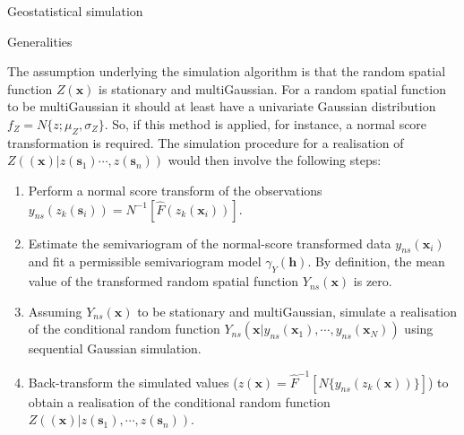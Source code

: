\documentclass[8pt]{beamer}
\renewcommand{\emph}[1]{\textcolor{myorange}{#1}}
\begin{document}
\begin{frame}{Geostatistical simulation}
     \begin{block}{Generalities}
    \end{block}
    The assumption underlying the \emph{simulation algorithm} is that the \emph{random spatial function} $Z(\mathbf{x})$ is \emph{stationary} and \emph{multiGaussian}. For a \emph{random spatial function} to be \emph{multiGaussian} it should at least have a \emph{univariate Gaussian distribution} $f_Z = N\{z;\mu_Z, \sigma_Z\}$. So, if this method is applied, for instance, a \emph{normal score transformation} is required. The \emph{simulation procedure} for a \emph{realisation} of $Z( (\mathbf{x}) | z(\mathbf{s}_1) \cdots, z(\mathbf{s}_n)) $ would then involve the following steps:
\begin{enumerate}
    \item Perform a \emph{normal score transform} of the observations $y_{ns}(z_k(\mathbf{s}_i)) = N^{-1}\left[ \hat{F}(z_k (\mathbf{x}_i)) \right]$.
    \item Estimate the \emph{semivariogram} of the \emph{normal-score transformed} data $y_{ns}(\mathbf{x}_i)$ and fit a \emph{permissible semivariogram model} $\gamma_Y (\mathbf{h})$. By definition, the \emph{mean} value of the transformed \emph{random spatial function} $Y_{ns}(\mathbf{x})$ is zero.
    \item Assuming $Y_{ns}(\mathbf{x})$ to be \emph{stationary} and \emph{multiGaussian}, simulate a \emph{realisation} of the \emph{conditional random function} $Y_{ns}(\mathbf{x}|y_{ns}(\mathbf{x}_1),\cdots,y_{ns}(\mathbf{x}_N))$ using \emph{sequential Gaussian simulation}.
    \item Back-transform the simulated values ($z(\mathbf{x}) = \hat{F}^{-1}\left[N\{y_{ns}(z_k (\mathbf{x}))\} \right]$)  to obtain a realisation of the conditional random function $Z((\mathbf{x})|z(\mathbf{s}_1), \cdots,z(\mathbf{s}_n))$.
    
\end{enumerate}
\end{frame}
\end{document}
